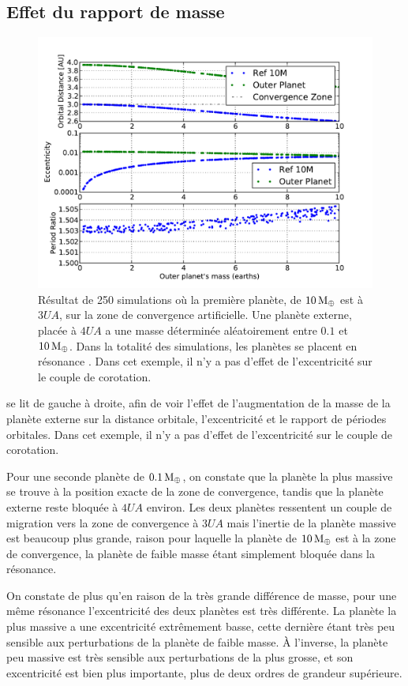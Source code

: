 \subsection{Effet du rapport de masse}
\begin{figure}[htbp]
\centering
\includegraphics[width=0.75\linewidth]{figure/MMR_mass_ratio.pdf}
\caption{Résultat de 250 simulations où la première planète, de $10\mathrm{\thinspace M_\oplus}$ est à $3\unit{UA}$, sur
la zone de convergence artificielle. Une planète externe, placée à $4\unit{UA}$ a une masse
déterminée aléatoirement entre $0.1$ et $10\mathrm{\thinspace M_\oplus}$. Dans la totalité des simulations, les planètes
se placent en résonance . Dans cet exemple, il n'y a pas d'effet de l'excentricité sur le
couple de corotation.}\label{fig:MMR_mass_ratio}
\end{figure}

 se lit de gauche à droite, afin de voir l'effet de l'augmentation de la masse de la planète externe
sur la distance orbitale, l'excentricité et le rapport de périodes orbitales. Dans cet exemple, il n'y a pas d'effet de
l'excentricité sur le couple de corotation.

Pour une seconde planète de $0.1\mathrm{\thinspace M_\oplus}$, on constate que la planète la plus massive se trouve à la position exacte de la
zone de convergence, tandis que la planète externe reste bloquée à $4\unit{UA}$ environ. Les deux planètes ressentent un couple
de
migration vers la zone de convergence à $3\unit{UA}$ mais l'inertie de la planète massive est beaucoup plus grande, raison pour
laquelle la planète de $10\mathrm{\thinspace M_\oplus}$ est à la zone de convergence, la planète de faible masse étant simplement bloquée dans la
résonance. 

On constate de plus qu'en raison de la très grande différence de masse, pour une même résonance l'excentricité des deux
planètes est très différente. La planète la plus massive a une excentricité extrêmement basse, cette dernière étant très peu
sensible aux perturbations de la planète de faible masse. À l'inverse, la planète peu massive est très sensible aux
perturbations de la plus grosse, et son excentricité est bien plus importante, plus de deux ordres de grandeur supérieure.

